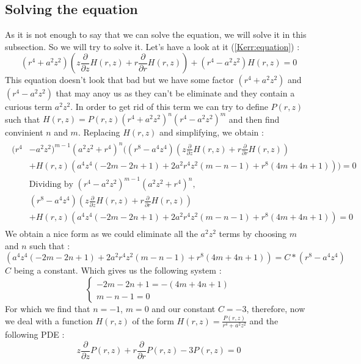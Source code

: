 \documentclass[a4paper,12pt]{article}
\theoremstyle{definition}
\begin{document}
\subsection{Solving the equation}
As it is not enough to say that we can solve the equation, we will solve it in this subsection.
So we will try to solve it.
Let's have a look at it (\ref{Kerr:equation}) :
\begin{equation}
	(r^4+a^2z^2)(z \frac{\partial}{\partial z}H(r,z)+r\frac{\partial}{\partial r}H(r,z))+(r^4-a^2 z^2) H(r,z)=0
\end{equation}
This equation doesn't look that bad but we have some factor $(r^4+a^2z^2)$ and $(r^4-a^2 z^2)$ that may anoy us as they can't be eliminate and they contain a curious term $a^2z^2$.
In order to get rid of this term we can try to define $P(r,z)$ such that $H(r,z)=P(r,z)(r^4+a^2z^2)^n(r^4-a^2 z^2)^m$ and then find convinient $n$ and $m$.
Replacing $H(r,z)$ and simplifying, we obtain :
\begin{align}
\begin{split}
	(r^4&-a^2 z^2)^{m-1} (a^2z^2+r^4)^n((r^8-a^4 z^4)(z \frac{\partial}{\partial z}H(r,z)+r \frac{\partial}{\partial r}H(r,z))\\
   &+H(r,z)(a^4 z^4 (-2 m-2 n+1)+2 a^2 r^4 z^2 (m-n-1)+r^8(4 m+4 n+1)))=0\\
   &\text{Dividing by }(r^4-a^2 z^2)^{m-1} (a^2z^2+r^4)^n,\\
   &(r^8-a^4 z^4)(z \frac{\partial}{\partial z}H(r,z)+r \frac{\partial}{\partial r}H(r,z))\\
   &+H(r,z)(a^4 z^4 (-2 m-2 n+1)+2 a^2 r^4 z^2 (m-n-1)+r^8(4 m+4 n+1))=0
\end{split}
\end{align}
We obtain a nice form as we could eliminate all the $a^2z^2$ terms by choosing $m$ and $n$ such that :
\begin{equation}
	(a^4 z^4 (-2 m-2 n+1)+2 a^2 r^4 z^2 (m-n-1)+r^8(4 m+4 n+1))=C*(r^8-a^4 z^4)
\end{equation}
$C$ being a constant. Which gives us the following system :
\begin{equation}
\begin{cases} -2 m-2 n+1=- (4 m+4 n+1)\\ m-n-1=0 \end{cases}
\end{equation}
For which we find that $n=-1$, $m=0$ and our constant $C=-3$, therefore, now we deal with a function $H(r,z)$ of the form $H(r,z)=\frac{P(r,z)}{r^4+a^2z^2}$ and the following PDE :
\begin{equation}\label{P:Eq}
	z \frac{\partial}{\partial z}P(r,z)+r \frac{\partial}{\partial r}P(r,z)-3P(r,z)=0
\end{equation}
\end{document}
